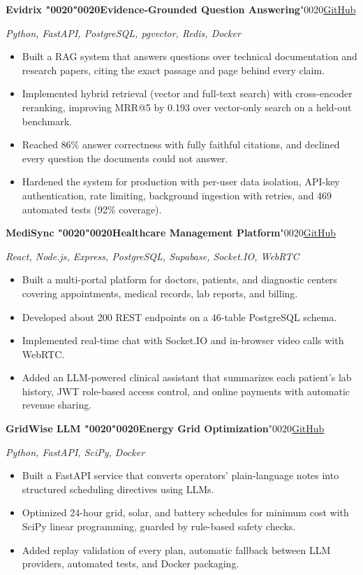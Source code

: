 \documentclass[10pt,a4paper]{article}
\newcommand{\realspace}{\XeTeXglyph\XeTeXcharglyph"0020\relax}
\newcommand{\psep}{\realspace\textbar\realspace}
\newcommand{\projectrow}[2]{\Needspace{4\baselineskip}\textbf{#1}\realspace\hfill #2\par}
\newcommand{\techrow}[1]{\textit{#1}\par\vspace{1pt}}
\begin{document}
\projectrow{Evidrix \psep Evidence-Grounded Question Answering}{\href{https://github.com/shahriarkabir280/evidrix}{GitHub}}
\techrow{Python, FastAPI, PostgreSQL, pgvector, Redis, Docker}
\begin{itemize}
  \item Built a RAG system that answers questions over technical documentation and research papers, citing the exact passage and page behind every claim.
  \item Implemented hybrid retrieval (vector and full-text search) with cross-encoder reranking, improving MRR@5 by 0.193 over vector-only search on a held-out benchmark.
  \item Reached 86\% answer correctness with fully faithful citations, and declined every question the documents could not answer.
  \item Hardened the system for production with per-user data isolation, API-key authentication, rate limiting, background ingestion with retries, and 469 automated tests (92\% coverage).
\end{itemize}

\projectrow{MediSync \psep Healthcare Management Platform}{\href{https://github.com/shahriarkabir280/MediSync}{GitHub}}
\techrow{React, Node.js, Express, PostgreSQL, Supabase, Socket.IO, WebRTC}
\begin{itemize}
  \item Built a multi-portal platform for doctors, patients, and diagnostic centers covering appointments, medical records, lab reports, and billing.
  \item Developed about 200 REST endpoints on a 46-table PostgreSQL schema.
  \item Implemented real-time chat with Socket.IO and in-browser video calls with WebRTC.
  \item Added an LLM-powered clinical assistant that summarizes each patient's lab history, JWT role-based access control, and online payments with automatic revenue sharing.
\end{itemize}

\projectrow{GridWise LLM \psep Energy Grid Optimization}{\href{https://github.com/shahriarkabir280/Energy-Grid-Optimization}{GitHub}}
\techrow{Python, FastAPI, SciPy, Docker}
\begin{itemize}
  \item Built a FastAPI service that converts operators' plain-language notes into structured scheduling directives using LLMs.
  \item Optimized 24-hour grid, solar, and battery schedules for minimum cost with SciPy linear programming, guarded by rule-based safety checks.
  \item Added replay validation of every plan, automatic fallback between LLM providers, automated tests, and Docker packaging.
\end{itemize}
\end{document}
